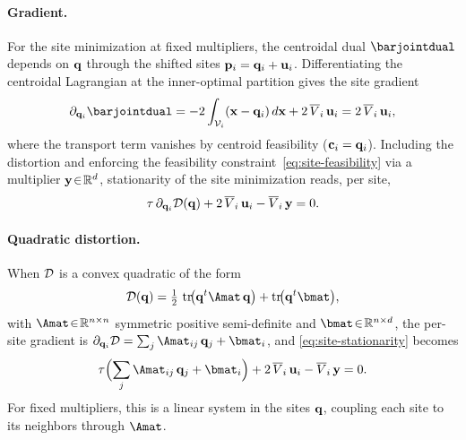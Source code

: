 \documentclass[main.tex]{subfiles}
\begin{document}
\paragraph{Gradient.}
For the site minimization at fixed multipliers, the centroidal dual $\barjointdual$ depends on $\mathbf{q}$ through the shifted sites $\mathbf{p}_i = \mathbf{q}_i + \mathbf{u}_i$.
Differentiating the centroidal Lagrangian at the inner-optimal partition gives the site gradient
\begin{equation}
  \partial_{\qq_i} \barjointdual
    = -2 \int_{\cell_i} (\xx - \qq_i) \, d\xx + 2\,\pvol_i\,\shift_i
    = 2\,\pvol_i\,\shift_i ,
  \label{eq:site-centroidal-gradient}
\end{equation}
where the transport term vanishes by centroid feasibility ($\mathbf{c}_i = \mathbf{q}_i$).
Including the distortion and enforcing the feasibility constraint~\eqref{eq:site-feasibility} via a multiplier $\mathbf{y} \!\in\! \mathbb{R}^d$, stationarity of the site minimization reads, per site,
\begin{equation}
  \tau\,\partial_{\mathbf{q}_i} \mathcal{D}(\mathbf{q}) + 2\,\overline{V}_i\,\mathbf{u}_i - \overline{V}_i\,\mathbf{y} = 0 .
  \label{eq:site-stationarity}
\end{equation}

\paragraph{Quadratic distortion.}
When $\mathcal{D}$ is a convex quadratic of the form
\begin{equation}
  \distortion(\qq)
    = \tfrac{1}{2}\,\operatorname{tr}\!\bigl(\qq\tr \Amat\, \qq\bigr)
    + \operatorname{tr}\!\bigl(\qq\tr \bmat\bigr) ,
  \label{eq:site-quadratic}
\end{equation}
with $\Amat \!\in\! \R^{n \times n}$ symmetric positive semi-definite and $\bmat \!\in\! \R^{n \times d}$, the per-site gradient is $\partial_{\qq_i} \distortion = \sum_j \Amat_{ij}\, \qq_j + \bmat_i$, and \eqref{eq:site-stationarity} becomes
\begin{equation}
  \tau \Bigl( \sum_j \Amat_{ij}\, \qq_j + \bmat_i \Bigr) + 2\,\pvol_i\,\shift_i - \pvol_i\,\yy = 0 .
  \label{eq:site-stationarity-quadratic}
\end{equation}
For fixed multipliers, this is a linear system in the sites $\mathbf{q}$, coupling each site to its neighbors through $\Amat$.
\end{document}
